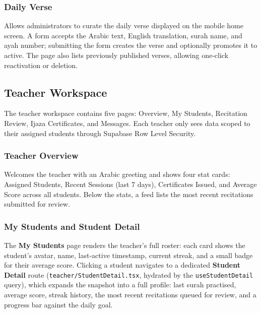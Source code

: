 
\subsubsection{Daily Verse}

Allows administrators to curate the daily verse displayed on the mobile home screen. A form accepts the Arabic text, English translation, surah name, and ayah number; submitting the form creates the verse and optionally promotes it to active. The page also lists previously published verses, allowing one-click reactivation or deletion.


\subsection{Teacher Workspace}

The teacher workspace contains five pages: Overview, My Students, Recitation Review, Ijaza Certificates, and Messages. Each teacher only sees data scoped to their assigned students through Supabase Row Level Security.

\subsubsection{Teacher Overview}

Welcomes the teacher with an Arabic greeting and shows four stat cards: Assigned Students, Recent Sessions (last 7 days), Certificates Issued, and Average Score across all students. Below the stats, a feed lists the most recent recitations submitted for review.


\subsubsection{My Students and Student Detail}

The \textbf{My Students} page renders the teacher's full roster: each card shows the student's avatar, name, last-active timestamp, current streak, and a small badge for their average score. Clicking a student navigates to a dedicated \textbf{Student Detail} route (\texttt{teacher/StudentDetail.tsx}, hydrated by the \texttt{useStudentDetail} query), which expands the snapshot into a full profile: last surah practised, average score, streak history, the most recent recitations queued for review, and a progress bar against the daily goal.

